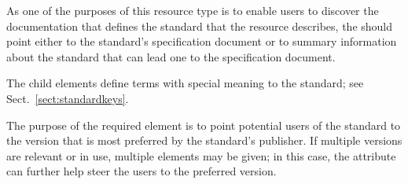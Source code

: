 \documentclass[11pt,a4paper]{ivoa}
\begin{document}

As one of the purposes of this resource type is to enable users to
discover the documentation that defines the standard that the resource
describes, the  should point either
to the standard's specification document or to summary information about
the standard that can lead one to the specification document.


The child  elements define terms with special
meaning to the standard; see Sect.~\ref{sect:standardkeys}.

The purpose of the required 
element is to point potential users of the standard to the version
that is most preferred by the standard's publisher.  If multiple
versions are relevant or in use, multiple elements may be given; in
this case, the  attribute can further help steer the
users to the preferred version.
\end{document}
